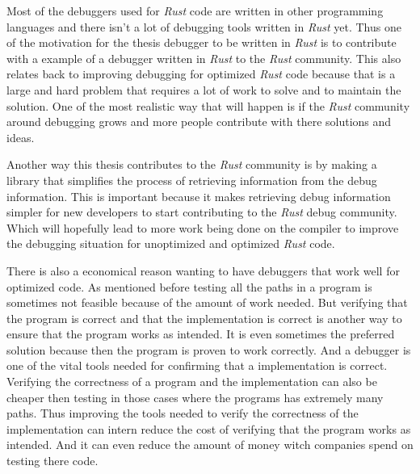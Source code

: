 Most of the debuggers used for \emph{Rust} code are written in other programming languages and there isn't a lot of debugging tools written in \emph{Rust} yet.
Thus one of the motivation for the thesis debugger to be written in \emph{Rust} is to contribute with a example of a debugger written in \emph{Rust} to the \emph{Rust} community.
This also relates back to improving debugging for optimized \emph{Rust} code because that is a large and hard problem that requires a lot of work to solve and to maintain the solution.
One of the most realistic way that will happen is if the \emph{Rust} community around debugging grows and more people contribute with there solutions and ideas.


Another way this thesis contributes to the \emph{Rust} community is by making a library that simplifies the process of retrieving information from the debug information.
This is important because it makes retrieving debug information simpler for new developers to start contributing to the \emph{Rust} debug community.
Which will hopefully lead to more work being done on the compiler to improve the debugging situation for unoptimized and  optimized \emph{Rust} code.


There is also a economical reason wanting to have debuggers that work well for optimized code.
As mentioned before testing all the paths in a program is sometimes not feasible because of the amount of work needed.
But verifying that the program is correct and that the implementation is correct is another way to ensure that the program works as intended.
It is even sometimes the preferred solution because then the program is proven to work correctly.
And a debugger is one of the vital tools needed for confirming that a implementation is correct.
Verifying the correctness of a program and the implementation can also be cheaper then testing in those cases where the programs has extremely many paths.
Thus improving the tools needed to verify the correctness of the implementation can intern reduce the cost of verifying that the program works as intended.
And it can even reduce the amount of money witch companies spend on testing there code.



